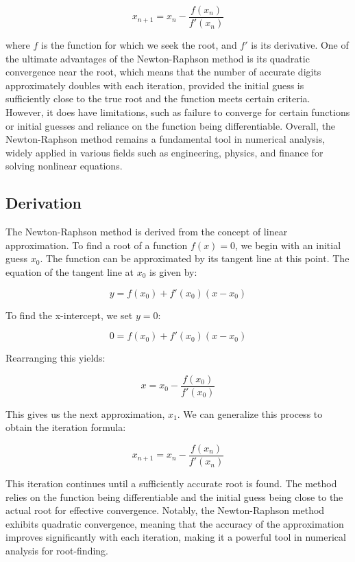 \documentclass[12pt,a4paper]{article}
\begin{document}
	\[
	x_{n+1} = x_n - \frac{f(x_n)}{f'(x_n)}
	\]
	
	where \(f\) is the function for which we seek the root, and \(f'\) is its derivative. One of the ultimate advantages of the Newton-Raphson method is its quadratic convergence near the root, which means that the number of accurate digits approximately doubles with each iteration, provided the initial guess is sufficiently close to the true root and the function meets certain criteria. However, it does have limitations, such as failure to converge for certain functions or initial guesses and reliance on the function being differentiable. Overall, the Newton-Raphson method remains a fundamental tool in numerical analysis, widely applied in various fields such as engineering, physics, and finance for solving nonlinear equations.
	\subsection{Derivation} 
	
	The Newton-Raphson method is derived from the concept of linear approximation. To find a root of a function \(f(x) = 0\), we begin with an initial guess \(x_0\). The function can be approximated by its tangent line at this point. The equation of the tangent line at \(x_0\) is given by:
	
	\[
	y = f(x_0) + f'(x_0)(x - x_0)
	\]
	
	To find the x-intercept, we set \(y = 0\):
	
	\[
	0 = f(x_0) + f'(x_0)(x - x_0)
	\]
	
	Rearranging this yields:
	
	\[
	x = x_0 - \frac{f(x_0)}{f'(x_0)}
	\]
	
	This gives us the next approximation, \(x_1\). We can generalize this process to obtain the iteration formula:
	
	\[
	x_{n+1} = x_n - \frac{f(x_n)}{f'(x_n)}
	\]
	
	This iteration continues until a sufficiently accurate root is found. The method relies on the function being differentiable and the initial guess being close to the actual root for effective convergence. Notably, the Newton-Raphson method exhibits quadratic convergence, meaning that the accuracy of the approximation improves significantly with each iteration, making it a powerful tool in numerical analysis for root-finding.
	
\end{document}
